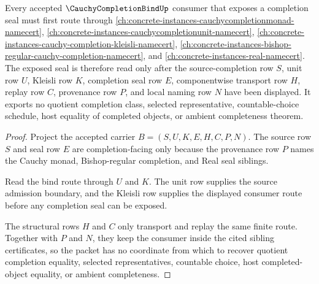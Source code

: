 \begin{theorem}
\label{thm:cauchy-completion-bind-real-completion-forward-link}
Every accepted $\CauchyCompletionBindUp$ consumer that exposes a completion seal must first route through \autoref{ch:concrete-instances-cauchycompletionmonad-namecert}, \autoref{ch:concrete-instances-cauchycompletionunit-namecert}, \autoref{ch:concrete-instances-cauchy-completion-kleisli-namecert}, \autoref{ch:concrete-instances-bishop-regular-cauchy-completion-namecert}, and \autoref{ch:concrete-instances-real-namecert}. The exposed seal is therefore read only after the source-completion row $S$, unit row $U$, Kleisli row $K$, completion seal row $E$, componentwise transport row $H$, replay row $C$, provenance row $P$, and local naming row $N$ have been displayed. It exports no quotient completion class, selected representative, countable-choice schedule, host equality of completed objects, or ambient completeness theorem.
\end{theorem}
\begin{proof}
Project the accepted carrier $B=(S,U,K,E,H,C,P,N)$. The source row $S$ and seal row $E$ are completion-facing only because the provenance row $P$ names the Cauchy monad, Bishop-regular completion, and Real seal siblings.

Read the bind route through $U$ and $K$. The unit row supplies the source admission boundary, and the Kleisli row supplies the displayed consumer route before any completion seal can be exposed.

The structural rows $H$ and $C$ only transport and replay the same finite route. Together with $P$ and $N$, they keep the consumer inside the cited sibling certificates, so the packet has no coordinate from which to recover quotient completion equality, selected representatives, countable choice, host completed-object equality, or ambient completeness.
\end{proof}



